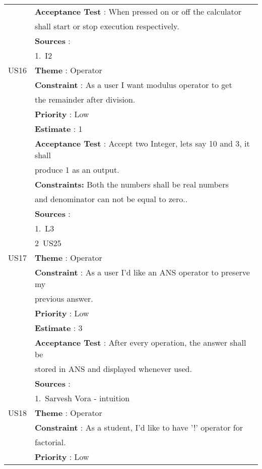 \documentclass{article}
\begin{document}
\begin{longtable}{|| c || l ||}
         & \textbf{Acceptance Test} : When pressed on or off the calculator \\
         & shall start or stop execution respectively.\\
         & \textbf{Sources} : \\
         & 1.~I2 \\
         \hline
         US16 & \textbf{Theme} : Operator \\
         & \textbf{Constraint} : As a user I want modulus operator to get \\
         & the remainder after division.\\
         & \textbf{Priority} : Low \\
         & \textbf{Estimate} : 1 \\
         & \textbf{Acceptance Test} : Accept two Integer, lets say 10 and 3, it shall\\
         & produce 1 as an output.\\
         & \textbf{Constraints: } Both the numbers shall be real numbers\\
         & and denominator can not be equal to zero..\\
         & \textbf{Sources} : \\
         & 1.~L3 \\
         & 2~US25 \\
         \hline
         \newpage
         \hline
         US17 & \textbf{Theme} : Operator \\
         & \textbf{Constraint} : As a user I'd like an ANS operator to preserve my \\
         & previous answer.\\
         & \textbf{Priority} : Low \\
         & \textbf{Estimate} : 3 \\
         & \textbf{Acceptance Test} : After every operation, the answer shall be \\
         & stored in ANS and displayed whenever used.\\
         & \textbf{Sources} : \\
         & 1.~Sarvesh Vora - intuition \\
         \hline
         US18 & \textbf{Theme} : Operator \\
         & \textbf{Constraint} : As a student, I'd like to have '!' operator for \\
         & factorial.\\
         & \textbf{Priority} : Low \\

\end{longtable}
\end{document}
